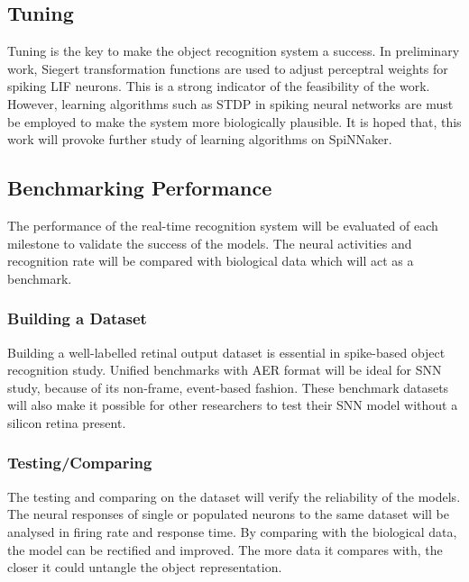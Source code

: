 \documentclass[journal]{journal}
\begin{document}
\subsection{Tuning}
Tuning is the key to make the object recognition system a success.
In preliminary work, Siegert transformation functions are used to adjust perceptral weights for spiking LIF neurons.
This is a strong indicator of the feasibility of the work.
However, learning algorithms such as STDP in spiking neural networks are must be employed to make the system more biologically plausible.
It is hoped that, this work will provoke further study of learning algorithms on SpiNNaker.
\subsection{Benchmarking Performance}
The performance of the real-time recognition system will be evaluated of each milestone to validate the success of the models.
The neural activities and recognition rate will be compared with biological data which will act as a benchmark.
\subsubsection{Building a Dataset}
Building a well-labelled retinal output dataset is essential in spike-based object recognition study.
Unified benchmarks with AER format will be ideal for SNN study, because of its non-frame, event-based fashion.
These benchmark datasets will also make it possible for other researchers to test their SNN model without a silicon retina present.
\subsubsection{Testing/Comparing}
The testing and comparing on the dataset will verify the reliability of the models.
The neural responses of single or populated neurons to the same dataset will be analysed in firing rate and response time.
By comparing with the biological data, the model can be rectified and improved.
The more data it compares with, the closer it could untangle the object representation. 



\end{document}
